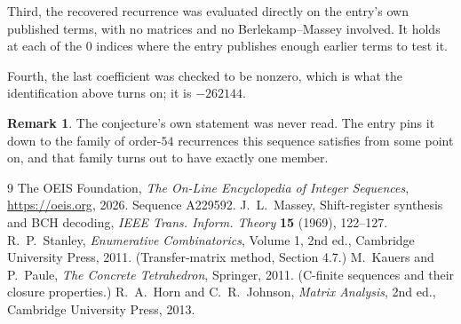 \documentclass[11pt,a4paper]{article}
\theoremstyle{plain}
\theoremstyle{definition}
\newtheorem{remark}[theorem]{Remark}
\begin{document}
Third, the recovered recurrence was evaluated directly on the entry's own published terms, with
no matrices and no Berlekamp--Massey involved. It holds at each of the $0$ indices where
the entry publishes enough earlier terms to test it.

Fourth, the last coefficient was checked to be nonzero, which is what the identification above
turns on; it is $-262144$.

\begin{remark}
The conjecture's own statement was never read. The entry pins it down to the family of
order-$54$ recurrences this sequence satisfies from some point on, and that family turns
out to have exactly one member.
\end{remark}

\begin{thebibliography}{9}
 The OEIS Foundation, \emph{The On-Line Encyclopedia of Integer
Sequences}, \url{https://oeis.org}, 2026. Sequence A229592.
 J.~L.~Massey, Shift-register synthesis and BCH decoding, \emph{IEEE
Trans. Inform. Theory} \textbf{15} (1969), 122--127.
 R.~P.~Stanley, \emph{Enumerative Combinatorics}, Volume 1, 2nd ed.,
Cambridge University Press, 2011. (Transfer-matrix method, Section 4.7.)
 M.~Kauers and P.~Paule, \emph{The Concrete Tetrahedron}, Springer, 2011.
(C-finite sequences and their closure properties.)
 R.~A.~Horn and C.~R.~Johnson, \emph{Matrix Analysis}, 2nd ed., Cambridge
University Press, 2013.
\end{thebibliography}
\end{document}
